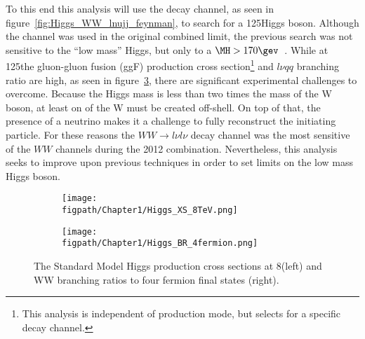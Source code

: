 To this end this analysis will use the \HWWlnujj decay channel, as seen in figure~\ref{fig:Higgs_WW_lnujj_feynman}, to search for a 125\gev Higgs boson.
Although the \HWWlnujj channel was used in the original combined limit, the previous search was not sensitive to the ``low mass'' Higgs, but only to a $\MH>170\gev$~\cite{CMS-PAS-HIG-13-027}.
While at 125\gev the gluon-gluon fusion (ggF) production cross section\footnote{This analysis is independent of production mode, but selects for a specific decay channel.} and $l\nu{qq}$ branching ratio are high, as seen in figure~\ref{fig:Higgs_XS_and_BR}, there are significant experimental challenges to overcome.
Because the Higgs mass is less than two times the mass of the W boson, at least on of the W must be created off-shell.
On top of that, the presence of a neutrino makes it a challenge to fully reconstruct the initiating particle.
For these reasons the $WW\rightarrow{l\nu}{l\nu}$ decay channel was the most sensitive of the $WW$ channels during the 2012 combination.
Nevertheless, this analysis seeks to improve upon previous techniques in order to set limits on the low mass Higgs boson.

\begin{figure}[!hbt]
	\centering
	\begin{subfigure}[t]{0.54\textwidth}
		\texttt{[image: \\figpath/Chapter1/Higgs\_XS\_8TeV.png]}
		\label{fig:CERN_accelerator_complex}
	\end{subfigure}
	\begin{subfigure}[t]{0.41\textwidth}
		\texttt{[image: \\figpath/Chapter1/Higgs\_BR\_4fermion.png]}
		\label{fig:LHC_LEP_injection_complex}
	\end{subfigure}
	\caption{The Standard Model Higgs production cross sections at 8\tev (left) and WW branching ratios to four fermion final states (right).}
	\label{fig:Higgs_XS_and_BR}
\end{figure}